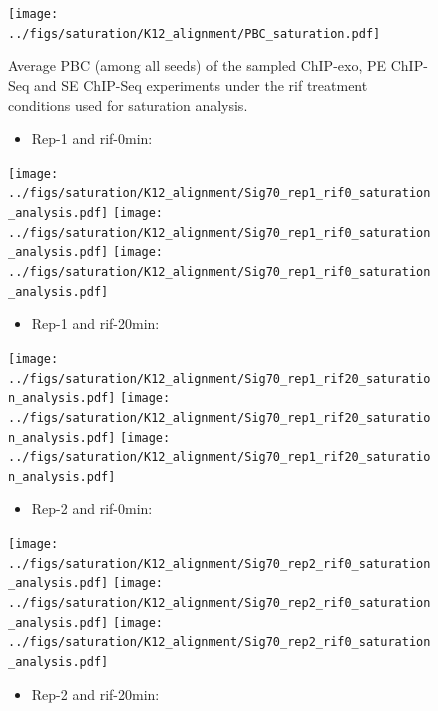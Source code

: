 \documentclass{bmcart}\usepackage[]{graphicx}\usepackage[]{color}
\begin{document}
\newpage

\begin{figure}[h!]
  \centering
  \texttt{[image: ../figs/saturation/K12\_alignment/PBC\_saturation.pdf]}
  \caption{Average PBC (among all seeds) of the sampled ChIP-exo, PE
    ChIP-Seq and SE ChIP-Seq experiments under the rif treatment
    conditions used for saturation analysis.}
  \label{fig:pbc_saturation}
\end{figure}

\newpage

\begin{figure}[h!] %
  \centering
  \begin{itemize}
  \item Rep-1 and rif-0min:
  \end{itemize}
  \texttt{[image: ../figs/saturation/K12\_alignment/Sig70\_rep1\_rif0\_saturation\_analysis.pdf]}
  \texttt{[image: ../figs/saturation/K12\_alignment/Sig70\_rep1\_rif0\_saturation\_analysis.pdf]}
  \texttt{[image: ../figs/saturation/K12\_alignment/Sig70\_rep1\_rif0\_saturation\_analysis.pdf]}

  \begin{itemize}
  \item Rep-1 and rif-20min:
  \end{itemize}

  \texttt{[image: ../figs/saturation/K12\_alignment/Sig70\_rep1\_rif20\_saturation\_analysis.pdf]}
  \texttt{[image: ../figs/saturation/K12\_alignment/Sig70\_rep1\_rif20\_saturation\_analysis.pdf]}
  \texttt{[image: ../figs/saturation/K12\_alignment/Sig70\_rep1\_rif20\_saturation\_analysis.pdf]}

  \begin{itemize}
  \item Rep-2 and rif-0min:
  \end{itemize}

  \texttt{[image: ../figs/saturation/K12\_alignment/Sig70\_rep2\_rif0\_saturation\_analysis.pdf]}
  \texttt{[image: ../figs/saturation/K12\_alignment/Sig70\_rep2\_rif0\_saturation\_analysis.pdf]}
  \texttt{[image: ../figs/saturation/K12\_alignment/Sig70\_rep2\_rif0\_saturation\_analysis.pdf]}

  \begin{itemize}
  \item Rep-2 and rif-20min:
  \end{itemize}


\end{figure}
\end{document}
